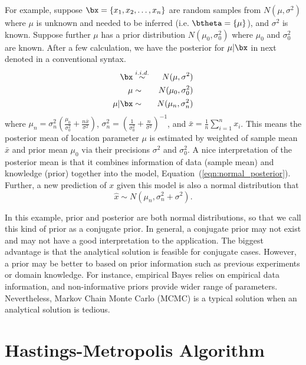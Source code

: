 For example, suppose $\bx = \{x_1, x_2, \ldots, x_n\}$ are random samples from
$N(\mu, \sigma^2)$ where $\mu$ is unknown and needed to be inferred
(i.e. $\btheta = \{\mu\}$), and
$\sigma^2$ is known. Suppose further $\mu$ has a prior distribution
$N(\mu_0, \sigma_0^2)$ where $\mu_0$ and $\sigma_0^2$ are known.
After a few calculation, we have the posterior for $\mu | \bx$ in next
denoted in a conventional syntax.
\begin{eqnarray}
\bx
  & \stackrel{i.i.d.}{\sim} & N(\mu, \sigma^2) \nonumber \\
\mu
  & \sim & N(\mu_0, \sigma_0^2) \nonumber \\
\mu|\bx
  & \sim & N(\mu_n, \sigma_n^2) \label{eqn:normal_posterior}
\end{eqnarray}
where
$\mu_n = \sigma_n^2
       \left(\frac{\mu_0}{\sigma_0^2} + \frac{n\bar{x}}{\sigma^2} \right)$,
$\sigma_n^2
 = \left(\frac{1}{\sigma_0^2} + \frac{n}{\sigma^2} \right)^{-1}$,
and $\bar{x} = \frac{1}{n} \sum_{i = 1}^n x_i$.
This means the posterior mean of location parameter $\mu$ is estimated by
weighted of sample mean $\bar{x}$ and prior mean $\mu_0$ via their precisions
$\sigma^2$ and $\sigma_0^2$. A nice interpretation of the posterior mean is
that it combines information of data (sample mean) and knowledge (prior)
together into the model, Equation~(\ref{eqn:normal_posterior}).
Further, a new prediction of $x$ given this model is also a normal
distribution that
\begin{equation}
\hat{x} \sim N(\mu_n, \sigma_n^2 + \sigma^2).
\label{eqn:normal_prediction}
\end{equation}

In this example, prior and posterior are both normal distributions, so that we
call this kind of prior as a conjugate prior.
In general, a conjugate prior may
not exist and may not have a good interpretation to the application.
The biggest advantage is that the analytical solution is feasible for conjugate
cases. However, a prior may be better to based on prior information such as
previous experiments or domain knowledge. For instance, empirical Bayes
relies on empirical data information, and non-informative priors provide
wider range of parameters. Nevertheless,
Markov Chain Monte Carlo (MCMC)
is a typical solution when an analytical solution is tedious.


\section{Hastings-Metropolis Algorithm}


